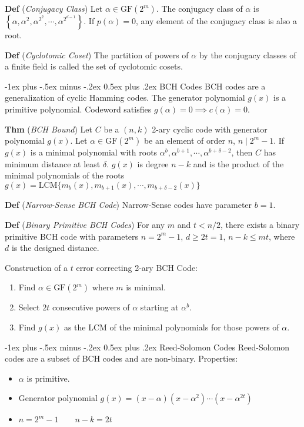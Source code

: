 \documentclass[12pt,landscape]{article}
\makeatletter
\renewcommand{\section}{\@startsection{section}{1}{0mm}%
                                {-1ex plus -.5ex minus -.2ex}%
                                {0.5ex plus .2ex}%
                                {\normalfont\normalsize\bfseries}}
\newcommand{\tab}{\hspace{.02\textwidth}}
\newcommand{\defn}[1]{\textbf{Def} (\emph{#1})}
\newcommand{\thm}[1]{\textbf{Thm} (\emph{#1})}
\newcommand{\set}[1]{\left\{ #1 \right\}}
\newcommand{\gf}[1]{\text{GF}(#1)}
\makeatother
\begin{document}
\begin{multicols*}{3}
\defn{Conjugacy Class} Let $\alpha \in \gf{2^m}$. The conjugacy class of $\alpha$ is $\set{\alpha, \alpha^2, \alpha^{2^2}, \cdots, \alpha^{2^{d-1}}}$. If $p(\alpha) = 0$, any element of the conjugacy class is also a root.

\defn{Cyclotomic Coset} The partition of powers of $\alpha$ by the conjugacy classes of a finite field is called the set of cyclotomic cosets.

\section{BCH Codes}
BCH codes are a generalization of cyclic Hamming codes. The generator polynomial $g(x)$ is a primitive polynomial. Codeword satisfies $g(\alpha) = 0 \implies c(\alpha) = 0$.

\thm{BCH Bound} Let $C$ be a $(n,k)$ 2-ary cyclic code with generator polynomial $g(x)$. Let $\alpha \in \gf{2^m}$ be an element of order $n$, $n \mid 2^m - 1$. If $g(x)$ is a minimal polynomial with roots $\alpha^b, \alpha^{b+1}, \cdots, \alpha^{b+\delta-2}$, then $C$ has minimum distance at least $\delta$. $g(x)$ is degree $n-k$ and is the product of the minimal polynomials of the roots\\
\tab $g(x) = \text{LCM}\{m_b(x), m_{b+1}(x), \cdots, m_{b+\delta-2}(x)\}$

\defn{Narrow-Sense BCH Code} Narrow-Sense codes have parameter $b = 1$.

\defn{Binary Primitive BCH Codes} For any $m$ and $t < n/2$, there exists a binary primitive BCH code with parameters $n = 2^m - 1$, $d \geq 2t = 1$, $n-k \leq mt$, where $d$ is the designed distance.

Construction of a $t$ error correcting 2-ary BCH Code:\\
\vspace{-0.5em}
\begin{enumerate}[itemsep=0em]
	\item Find $\alpha \in \gf{2^m}$ where $m$ is minimal.
	\item Select $2t$ consecutive powers of $\alpha$ starting at $\alpha^b$.
	\item Find $g(x)$ as the LCM of the minimal polynomials for those powers of $\alpha$.
\end{enumerate}

\section{Reed-Solomon Codes}
Reed-Solomon codes are a subset of BCH codes and are non-binary. Properties:
\vspace{-0.5em}
\begin{itemize}[itemsep=0em]
	\item $\alpha$ is primitive.
	\item Generator polynomial $g(x) = (x-\alpha)(x-\alpha^2)\cdots(x-\alpha^{2t})$
	\item $n = 2^m -1 \qquad n - k = 2t$
\end{itemize}


\end{multicols*}
\end{document}
